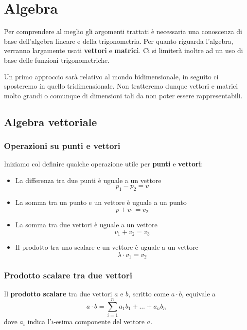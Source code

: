 \chapter{Algebra} \label{algebra}
Per comprendere al meglio gli argomenti trattati \`e necessaria una conoscenza di base
dell'algebra lineare e della trigonometria. Per quanto riguarda l'algebra, verranno largamente usati
\textbf{vettori} e \textbf{matrici}. Ci si limiter\`a inoltre ad un uso di base delle funzioni trigonometriche.

Un primo approccio sar\`a relativo al mondo bidimensionale, in seguito ci sposteremo in quello tridimensionale.
Non tratteremo dunque vettori e matrici molto grandi o comunque di dimensioni tali da non poter essere rappresentabili.

\section{Algebra vettoriale}
\subsection{Operazioni su punti e vettori}
Iniziamo col definire qualche operazione utile per \textbf{punti} e \textbf{vettori}:
\begin{itemize}
	\item La differenza tra due punti \`e uguale a un vettore
	      \[ p_1 - p_2 = v \]
	\item La somma tra un punto e un vettore \`e uguale a un punto
	      \[ p + v_1 = v_2 \]
	\item La somma tra due vettori \`e uguale a un vettore
	      \[ v_1 + v_2 = v_3 \]
	\item Il prodotto tra uno scalare e un vettore \`e uguale a un vettore
	      \[ \lambda \cdot v_1 = v_2 \]
\end{itemize}

\subsection{Prodotto scalare tra due vettori}
Il \textbf{prodotto scalare} tra due vettori $a$ e $b$, scritto come $a \cdot b$, equivale a
\[ a \cdot b = \sum_{i=1}^n a_1 b_1 + \dots + a_n b_n  \]
dove $a_i$ indica l'$i$-esima componente del vettore $a$.

